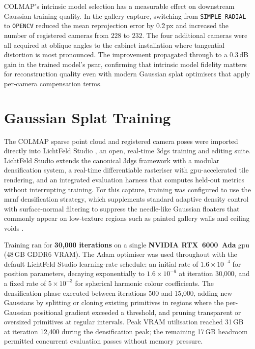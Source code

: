 \begin{technote}
  COLMAP's intrinsic model selection has a measurable effect on downstream Gaussian training quality. In the gallery capture, switching from \texttt{SIMPLE\_RADIAL} to \texttt{OPENCV} reduced the mean reprojection error by 0.2\,px and increased the number of registered cameras from 228 to 232. The four additional cameras were all acquired at oblique angles to the cabinet installation where tangential distortion is most pronounced. The improvement propagated through to a 0.3\,dB gain in the trained model's \acrshort{psnr}, confirming that intrinsic model fidelity matters for reconstruction quality even with modern Gaussian splat optimisers that apply per-camera compensation terms.
\end{technote}

\section{Gaussian Splat Training}
\label{sec:recon-training}

The COLMAP sparse point cloud and registered camera poses were imported directly into LichtFeld Studio \parencite{LichtFeldStudio2026}, an open, real-time \acrshort{3dgs} training and editing suite. LichtFeld Studio extends the canonical \acrshort{3dgs} framework \parencite{Kerbl2023} with a modular densification system, a real-time differentiable rasteriser with \acrshort{gpu}-accelerated tile rendering, and an integrated evaluation harness that computes held-out metrics without interrupting training. For this capture, training was configured to use the \acrshort{mrnf} densification strategy, which supplements standard adaptive density control with surface-normal filtering to suppress the needle-like Gaussian floaters that commonly appear on low-texture regions such as painted gallery walls and ceiling voids \parencite{Kheradmand2024,Yu2024MipSplatting}.

Training ran for \textbf{30,000 iterations} on a single \textbf{NVIDIA RTX~6000~Ada} \acrshort{gpu} (48\,GB GDDR6 VRAM). The Adam optimiser was used throughout with the default LichtFeld Studio learning-rate schedule: an initial rate of $1.6 \times 10^{-4}$ for position parameters, decaying exponentially to $1.6 \times 10^{-6}$ at iteration 30,000, and a fixed rate of $5 \times 10^{-3}$ for spherical harmonic colour coefficients. The densification phase executed between iterations 500 and 15,000, adding new Gaussians by splitting or cloning existing primitives in regions where the per-Gaussian positional gradient exceeded a threshold, and pruning transparent or oversized primitives at regular intervals. Peak VRAM utilisation reached 31\,GB at iteration 12,400 during the densification peak; the remaining 17\,GB headroom permitted concurrent evaluation passes without memory pressure.

